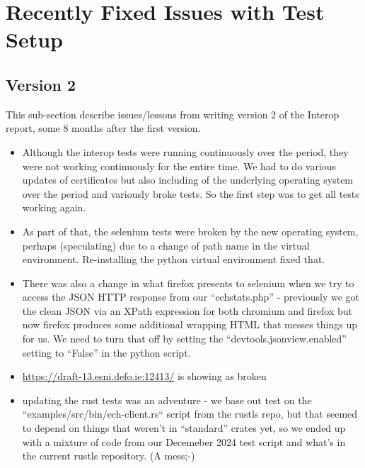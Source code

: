 \section{Recently Fixed Issues with Test Setup}
\label{app:alongtheway}

\subsection{Version 2}

This sub-section describe issues/lessons from writing version 2 of
the Interop report, some 8 months after the first version.

\begin{itemize}

\item Although the interop tests were running continuously over the period,
    they were not working continuously for the entire time. We had to do
        various updates of certificates but also including of the underlying
        operating system over the period and variously broke tests. So the
        first step was to get all tests working again.

\item As part of that, the selenium tests were broken by the new operating
    system, perhaps (speculating) due to a change of path name in the virtual
        environment. Re-installing the python virtual environment fixed that.

\item There was also a change in what firefox presents to selenium when we
    try to access the JSON HTTP response from our ``echstats.php'' -
        previously we got the clean JSON via an XPath
        expression for both chromium and firefox but now firefox produces
        some additional wrapping HTML that messes things up for us. We need
        to turn that off by setting the ``devtools.jsonview.enabled'' setting
        to ``False'' in the python script.

\item \url{https://draft-13.esni.defo.ie:12413/} is showing as broken

\item updating the rust tests was an adventure - we base out test on the
    ``examples/src/bin/ech-client.rs`` script from the rustls repo, but 
        that seemed to depend on things that weren't in ``standard'' crates
        yet, so we ended up with a mixture of code from our Decemeber 2024
        test script and what's in the current rustls repository. (A mess;-)

\end{itemize}


